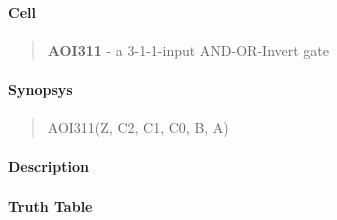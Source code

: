 \label{AOI311}
\paragraph{Cell}
\begin{quote}
    \textbf{AOI311} - a 3-1-1-input AND-OR-Invert gate
\end{quote}

\paragraph{Synopsys}
\begin{quote}
    AOI311(Z, C2, C1, C0, B, A)
\end{quote}

\paragraph{Description}



\paragraph{Truth Table}


